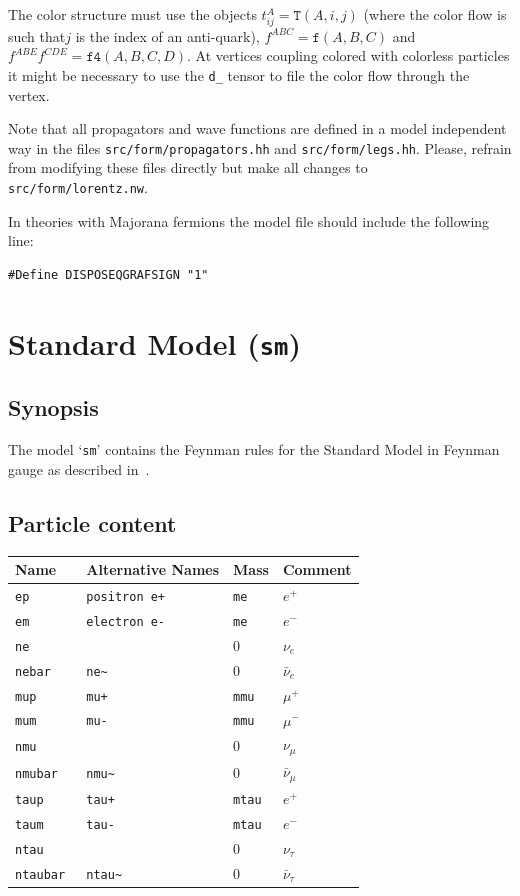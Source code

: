 \documentclass[11pt,a4paper]{refrep}
\begin{document}
The color structure must use the objects $t_{ij}^A=\mathtt{T}(A, i, j)$ (where the color flow is such
that$j$ is the index of an anti-quark), $f^{ABC}=\mathtt{f}(A, B, C)$ and
$f^{ABE}f^{CDE}=\mathtt{f4}(A,B,C,D)$. At vertices coupling colored with colorless particles
it might be necessary to use the \texttt{d\_} tensor to file the color flow through the vertex.

\attention Note that all propagators and wave functions are defined in a model independent
way in the files \texttt{src/form/propagators.hh} and \texttt{src/form/legs.hh}. Please,
refrain from modifying these files directly but make all changes to \texttt{src/form/lorentz.nw}.

In theories with Majorana fermions the model file should include the following
line:
\begin{lstlisting}[language=form]
#Define DISPOSEQGRAFSIGN "1"
\end{lstlisting}

\section{Standard Model (\texttt{sm})}
\label{sec:model-files:sm}
\subsection{Synopsis}
The model `\texttt{sm}' contains the Feynman rules for the
Standard Model in Feynman gauge as described
in~\cite[Appendix~A]{Boehm:2001}.

\subsection{Particle content}
\begin{tabular}{|l|l|l|p{2cm}|}
\hline
Name&Alternative Names&Mass&Comment\\
\hline
\tt ep & \tt positron e+ & \tt me& $e^+$\\
\tt em & \tt electron e- & \tt me& $e^-$\\
\tt ne & & $0$ & $\nu_e$\\
\tt nebar & \tt ne\~& $0$ & $\bar{\nu}_e$\\
\hline
\tt mup & \tt mu+ & \tt mmu& $\mu^+$\\
\tt mum & \tt mu- & \tt mmu& $\mu^-$\\
\tt nmu & & $0$ & $\nu_\mu$\\
\tt nmubar & \tt nmu\~ & $0$ & $\bar{\nu}_\mu$\\
\hline
\tt taup & \tt tau+ & \tt mtau& $e^+$\\
\tt taum & \tt tau- & \tt mtau& $e^-$\\
\tt ntau & & $0$ & $\nu_\tau$\\
\tt ntaubar & \tt ntau\~ & $0$ & $\bar{\nu}_\tau$\\
\hline
\end{tabular}
\end{document}
